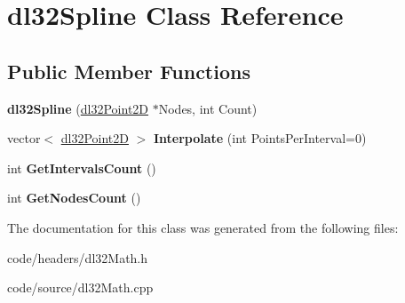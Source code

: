 \hypertarget{classdl32_spline}{\section{dl32\-Spline Class Reference}
\label{classdl32_spline}
}
\subsection*{Public Member Functions}
\begin{DoxyCompactItemize}
\item 
\hypertarget{classdl32_spline_a5b48be3a0c114e28fb88effb3b524a93}{{\bfseries dl32\-Spline} (\hyperlink{structdl32_point2_d}{dl32\-Point2\-D} $\ast$Nodes, int Count)}\label{classdl32_spline_a5b48be3a0c114e28fb88effb3b524a93}

\item 
\hypertarget{classdl32_spline_a5d334682e628819147d197f0b17855db}{vector$<$ \hyperlink{structdl32_point2_d}{dl32\-Point2\-D} $>$ {\bfseries Interpolate} (int Points\-Per\-Interval=0)}\label{classdl32_spline_a5d334682e628819147d197f0b17855db}

\item 
\hypertarget{classdl32_spline_a5efd6cc4b26717db63a05de0113a451e}{int {\bfseries Get\-Intervals\-Count} ()}\label{classdl32_spline_a5efd6cc4b26717db63a05de0113a451e}

\item 
\hypertarget{classdl32_spline_a3c3fea6f66b2217a0d8b647a9e7608ad}{int {\bfseries Get\-Nodes\-Count} ()}\label{classdl32_spline_a3c3fea6f66b2217a0d8b647a9e7608ad}

\end{DoxyCompactItemize}


The documentation for this class was generated from the following files\-:\begin{DoxyCompactItemize}
\item 
code/headers/dl32\-Math.\-h\item 
code/source/dl32\-Math.\-cpp\end{DoxyCompactItemize}
